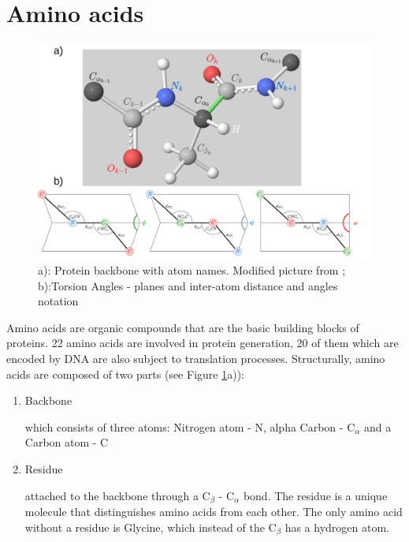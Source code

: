 \section{Amino acids}

\begin{figure}
    \centering
    \includegraphics[width=\linewidth]{imgs_tomas/torsion_2.png}
    \caption{a): Protein backbone with atom names. Modified picture from \cite{ramachandran}; b):Torsion Angles - planes and inter-atom distance and angles notation}
    \label{fig:backbone_torsion}
\end{figure}



Amino acids are organic compounds that are the basic building blocks of proteins. 
22 amino acids are involved in protein generation, 20 of them which are encoded by DNA are also subject to translation processes. 
Structurally, amino acids are composed of two parts (see Figure \ref{fig:backbone_torsion}a)):

\begin{enumerate}
    \item Backbone
    
        which consists of three atoms: Nitrogen atom - N, alpha Carbon - C$_\alpha$ and a Carbon atom - C
    \item Residue
        
        attached to the backbone through a C$_\beta$ - C$_\alpha$ bond. The residue is a unique molecule that distinguishes amino acids from each other. The only amino acid without a residue is Glycine, which instead of the C$_\beta$ has a hydrogen atom.
\end{enumerate}

